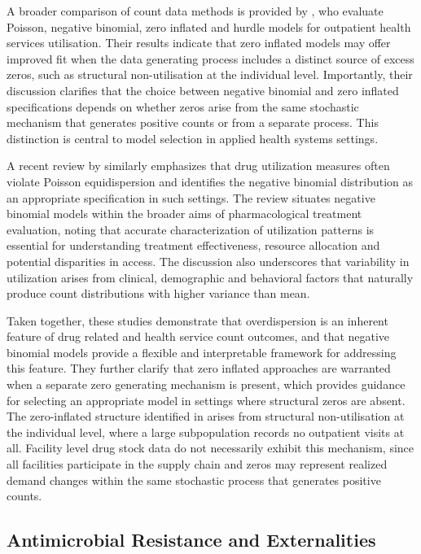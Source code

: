 \documentclass{article}
\begin{document}
A broader comparison of count data methods is provided by \cite{ab2022}, who evaluate Poisson, negative binomial, zero inflated and hurdle models for outpatient health services utilisation. Their results indicate that zero inflated models may offer improved fit when the data generating process includes a distinct source of excess zeros, such as structural non-utilisation at the individual level. Importantly, their discussion clarifies that the choice between negative binomial and zero inflated specifications depends on whether zeros arise from the same stochastic mechanism that generates positive counts or from a separate process. This distinction is central to model selection in applied health systems settings.

A recent review by \cite{rath2024} similarly emphasizes that drug utilization measures often violate Poisson equidispersion and identifies the negative binomial distribution as an appropriate specification in such settings. The review situates negative binomial models within the broader aims of pharmacological treatment evaluation, noting that accurate characterization of utilization patterns is essential for understanding treatment effectiveness, resource allocation and potential disparities in access. The discussion also underscores that variability in utilization arises from clinical, demographic and behavioral factors that naturally produce count distributions with higher variance than mean.

Taken together, these studies demonstrate that overdispersion is an inherent feature of drug related and health service count outcomes, and that negative binomial models provide a flexible and interpretable framework for addressing this feature. They further clarify that zero inflated approaches are warranted when a separate zero generating mechanism is present, which provides guidance for selecting an appropriate model in settings where structural zeros are absent. The zero-inflated structure identified in \cite{ab2022} arises from structural non-utilisation at the individual level, where a large subpopulation records no outpatient visits at all. Facility level drug stock data do not necessarily exhibit this mechanism, since all facilities participate in the supply chain and zeros may represent realized demand changes within the same stochastic process that generates positive counts.

\subsection{Antimicrobial Resistance and Externalities}
\end{document}
